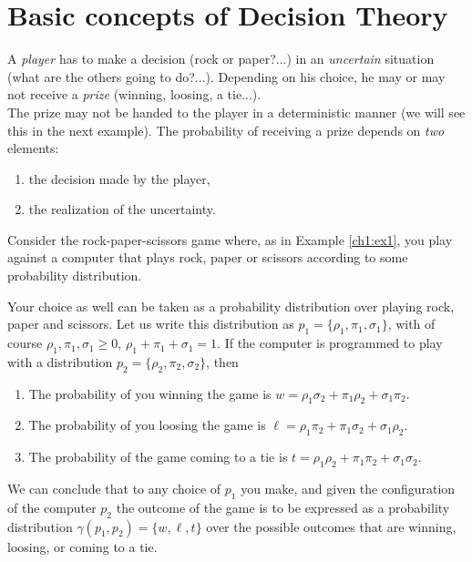 \section{Basic concepts of Decision Theory}


A \emph{player} has to make a decision (rock or paper?...) in an \emph{uncertain} situation (what are the others going to do?...). Depending on his choice, he may or may not receive a  \emph{prize} (winning, loosing, a tie...). \\
The prize may not be handed to the player in a deterministic manner (we will see this in the next example). The probability of receiving a prize depends on \emph{two} elements: 
\begin{enumerate}
\item the decision made by the player, 
\item the realization of the uncertainty.
\end{enumerate}

\begin{example}
\label{ch1:ex2}

Consider the rock-paper-scissors game where, as in Example \ref{ch1:ex1}, you play against a computer that plays rock, paper or scissors according to some probability distribution. 

Your choice as well can be taken as a probability distribution over playing rock, paper and scissors. Let us write this distribution as $p_1 = \{\rho_1, \pi_1, \sigma_1\}$, with   of course $\rho_1, \pi_1, \sigma_1 \geq 0$, $\rho_1+\pi_1+\sigma_1 = 1$.
If the computer is programmed to play with a distribution
$p_2 = \{\rho_2,  \pi_2, \sigma_2\}$, then
\begin{enumerate}
\item The probability of you winning the game is 
$w = \rho_1 \sigma_2 + \pi_1 \rho_2 + \sigma_1 \pi_2.$
\item The probability of you loosing the game is 
$\ell = \rho_1 \pi_2 + \pi_1 \sigma_2 + \sigma_1 \rho_2.$
\item The probability of the game coming to a tie is 
$t = \rho_1 \rho_2 + \pi_1 \pi_2 + \sigma_1 \sigma_2.$
\end{enumerate}
We can conclude that to any choice of $p_1$ you make, and given the configuration of the computer $p_2$ the outcome of the game is to be expressed as a probability distribution $\gamma(p_1, p_2) = \{w, \ell, t\}$ over  the possible outcomes that are winning, loosing, or coming to a tie. 

\end{example}

